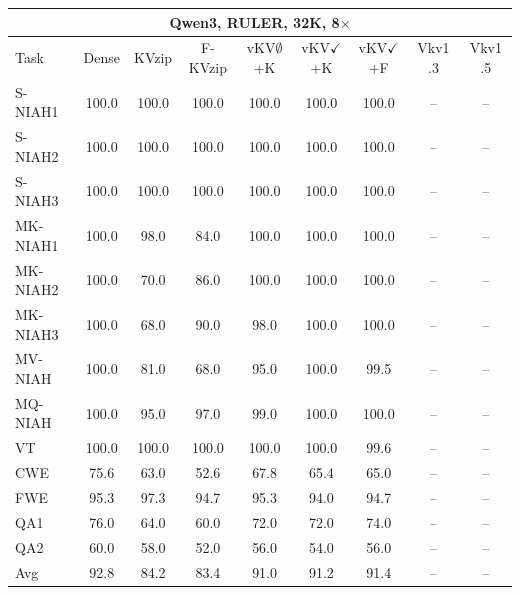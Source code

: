 \begin{tabular}{lcccccccc}
\toprule
\multicolumn{9}{c}{Qwen3, RULER, 32K, 8$\times$} \\
\midrule
Task & Dense & KVzip & F-KVzip & vKV$\emptyset$+K & vKV$\checkmark$+K & vKV$\checkmark$+F & Vkv1 .3 & Vkv1 .5 \\
\midrule
S-NIAH1 & 100.0 & 100.0 & 100.0 & 100.0 & 100.0 & 100.0 & -- & -- \\
S-NIAH2 & 100.0 & 100.0 & 100.0 & 100.0 & 100.0 & 100.0 & -- & -- \\
S-NIAH3 & 100.0 & 100.0 & 100.0 & 100.0 & 100.0 & 100.0 & -- & -- \\
MK-NIAH1 & 100.0 & 98.0 & 84.0 & 100.0 & 100.0 & 100.0 & -- & -- \\
MK-NIAH2 & 100.0 & 70.0 & 86.0 & 100.0 & 100.0 & 100.0 & -- & -- \\
MK-NIAH3 & 100.0 & 68.0 & 90.0 & 98.0 & 100.0 & 100.0 & -- & -- \\
MV-NIAH & 100.0 & 81.0 & 68.0 & 95.0 & 100.0 & 99.5 & -- & -- \\
MQ-NIAH & 100.0 & 95.0 & 97.0 & 99.0 & 100.0 & 100.0 & -- & -- \\
VT & 100.0 & 100.0 & 100.0 & 100.0 & 100.0 & 99.6 & -- & -- \\
CWE & 75.6 & 63.0 & 52.6 & 67.8 & 65.4 & 65.0 & -- & -- \\
FWE & 95.3 & 97.3 & 94.7 & 95.3 & 94.0 & 94.7 & -- & -- \\
QA1 & 76.0 & 64.0 & 60.0 & 72.0 & 72.0 & 74.0 & -- & -- \\
QA2 & 60.0 & 58.0 & 52.0 & 56.0 & 54.0 & 56.0 & -- & -- \\
\midrule
Avg & 92.8 & 84.2 & 83.4 & 91.0 & 91.2 & 91.4 & -- & -- \\
\bottomrule
\end{tabular}
\vspace{0.8em}

